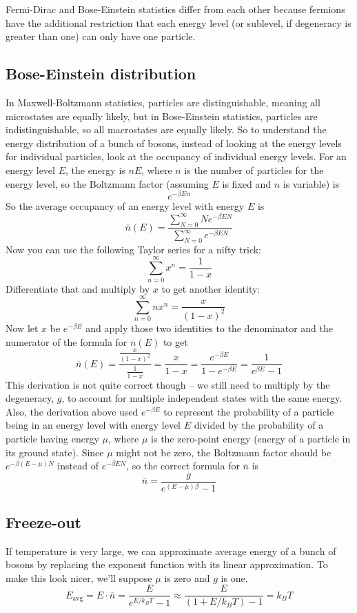\documentclass[12pt]{article}
\begin{document}
Fermi-Dirac and Bose-Einstein statistics differ from each other because fermions have the additional restriction that each energy level (or sublevel, if degeneracy is greater than one) can only have one particle.

\subsection{Bose-Einstein distribution}
In Maxwell-Boltzmann statistics, particles are distinguishable, meaning all microstates are equally likely, but in Bose-Einstein statistics, particles are indistinguishable, so all macrostates are equally likely. So to understand the energy distribution of a bunch of bosons, instead of looking at the energy levels for individual particles, look at the occupancy of individual energy levels. For an energy level $E$, the energy is $nE$, where $n$ is the number of particles for the energy level, so the Boltzmann factor (assuming $E$ is fixed and $n$ is variable) is
\[e^{- \beta E n}\]
So the average occupancy of an energy level with energy $E$ is
\[\overline{n}(E) = \frac{\sum\limits_{N=0}^\infty N e^{- \beta E N}}{\sum\limits_{N=0}^\infty e^{- \beta E N}}\]
Now you can use the following Taylor series for a nifty trick:
\[\sum_{n=0}^\infty x^n = \frac{1}{1 - x} \]
Differentiate that and multiply by $x$ to get another identity:
\[\sum_{n=0}^\infty nx^n = \frac{x}{(1-x)^2} \]
Now let $x$ be $e^{-\beta E}$ and apply those two identities to the denominator and the numerator of the formula for $\overline{n}(E)$ to get
\[\overline{n}(E) = \frac{ \frac{x}{(1-x)^2} }{ \frac{1}{1-x} } = \frac{x}{1 - x} = \frac{e^{-\beta E}}{1 - e^{-\beta E}} = \frac{1}{e^{\beta E} - 1} \]
This derivation is not quite correct though -- we still need to multiply by the degeneracy, $g$, to account for multiple independent states with the same energy. Also, the derivation above used $e^{-\beta E}$ to represent the probability of a particle being in an energy level with energy level $E$ divided by the probability of a particle having energy $\mu$, where $\mu$ is the zero-point energy (energy of a particle in its ground state). Since $\mu$ might not be zero, the Boltzmann factor should be $e^{-\beta (E - \mu) N}$ instead of $e^{-\beta E N}$, so the correct formula for $\overline{n}$ is
\[\overline{n} = \frac{g}{e^{(E - \mu) \beta} - 1} \]

\subsection{Freeze-out}
If temperature is very large, we can approximate average energy of a bunch of bosons by replacing the exponent function with its linear approximation. To make this look nicer, we'll suppose $\mu$ is zero and $g$ is one.
\[E_\text{avg} = E \cdot \overline{n} = \frac{E}{e^{E / k_B T} - 1} \approx \frac{E}{(1 + E / k_B T) - 1} = k_B T\]
\end{document}
